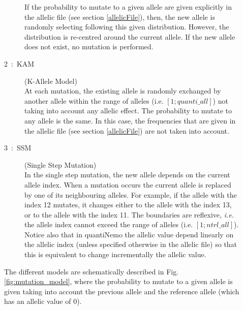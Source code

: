 \documentclass[letterpaper,12pt,oneside]{book}
\begin{document}
\begin{description}
\begin{description}
If the probability to mutate to a given allele are given explicitly in the allelic file (see section \ref{allelicFile}), then, the new allele is randomly selecting following this given distribution. However, the distribution is re-centred around the current allele. If the new allele does not exist, no mutation is performed. 

\item[2~:~KAM] (K-Allele Model)\\
At each mutation, the existing allele is randomly exchanged by another allele within the range of alleles (i.e. $[1; quanti\_all]$) not taking into account any allelic effect. The probability to mutate to any allele is the same. In this case, the frequencies that are given in the allelic file (see section \ref{allelicFile}) are not taken into account. 

\item[3~:~SSM] (Single Step Mutation)\\
In the single step mutation, the new allele depends on the current allele index. When a mutation occurs the current allele is replaced by one of its neighbouring alleles. For example, if the allele with the index 12 mutates, it changes either to the allele with the index 13, or to the allele with the index 11. The boundaries are reflexive, \textit{i.e.} the allele index cannot exceed the range of alleles (i.e. $[1; ntrl\_all]$). Notice also that in quantiNemo the allelic value depend linearly on the allelic index (unless specified otherwise in the allelic file) so that this is equivalent to change incrementally the allelic value. 
\end{description}
The different models are schematically described in Fig. \ref{fig:mutation_model}, where the probability to mutate to a given allele is given taking into account the previous allele and the reference allele (which has an allelic value of 0). 


\end{description}
\end{document}
